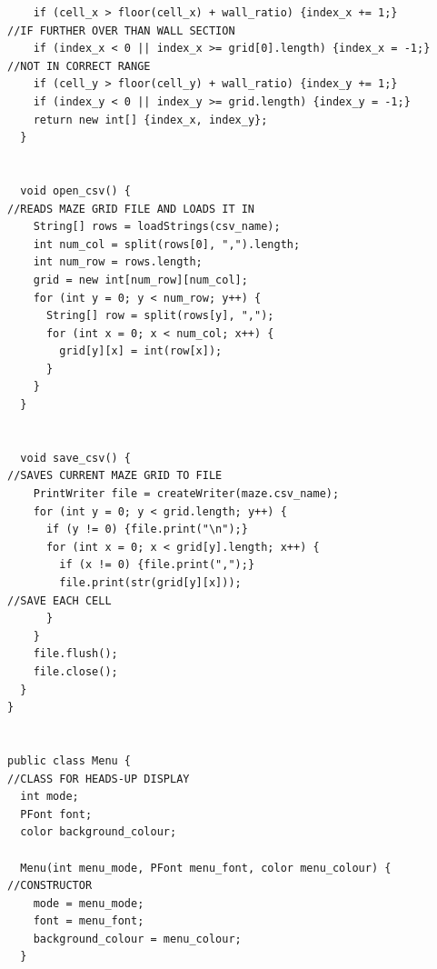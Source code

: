 \documentclass[titlepage]{article}
\begin{document}
\begin{changemargin}{-1in}{-1in}
\begin{verbatim}
    if (cell_x > floor(cell_x) + wall_ratio) {index_x += 1;}                    //IF FURTHER OVER THAN WALL SECTION
    if (index_x < 0 || index_x >= grid[0].length) {index_x = -1;}               //NOT IN CORRECT RANGE
    if (cell_y > floor(cell_y) + wall_ratio) {index_y += 1;}
    if (index_y < 0 || index_y >= grid.length) {index_y = -1;}
    return new int[] {index_x, index_y};
  }

  
  void open_csv() {                                                             //READS MAZE GRID FILE AND LOADS IT IN
    String[] rows = loadStrings(csv_name);
    int num_col = split(rows[0], ",").length;
    int num_row = rows.length;
    grid = new int[num_row][num_col];
    for (int y = 0; y < num_row; y++) {
      String[] row = split(rows[y], ",");
      for (int x = 0; x < num_col; x++) {
        grid[y][x] = int(row[x]);
      }
    }
  }


  void save_csv() {                                                               //SAVES CURRENT MAZE GRID TO FILE
    PrintWriter file = createWriter(maze.csv_name);
    for (int y = 0; y < grid.length; y++) {
      if (y != 0) {file.print("\n");}
      for (int x = 0; x < grid[y].length; x++) {
        if (x != 0) {file.print(",");}
        file.print(str(grid[y][x]));                                              //SAVE EACH CELL
      }
    }
    file.flush();
    file.close();  
  }
}


public class Menu {                                                               //CLASS FOR HEADS-UP DISPLAY
  int mode;
  PFont font;
  color background_colour; 
  
  Menu(int menu_mode, PFont menu_font, color menu_colour) {                       //CONSTRUCTOR
    mode = menu_mode;
    font = menu_font;
    background_colour = menu_colour;
  }
  

\end{verbatim}
\end{changemargin}
\end{document}
